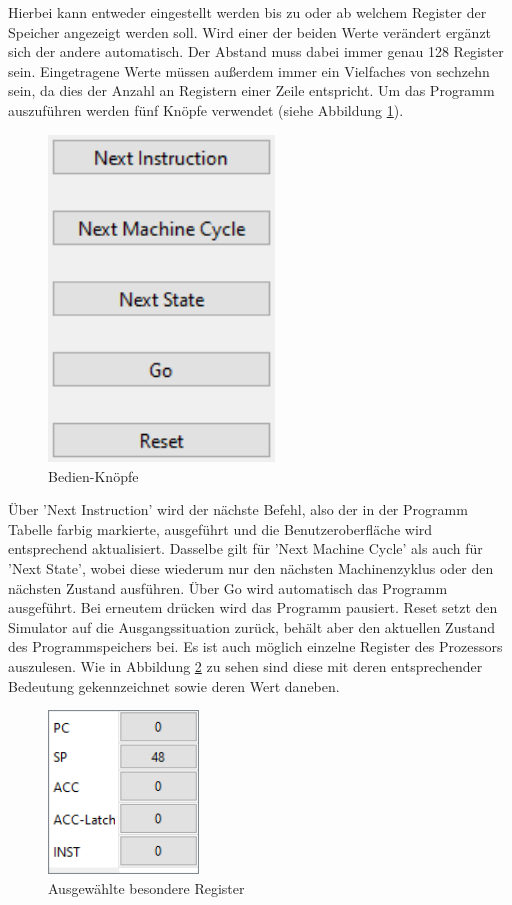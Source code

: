 \documentclass[12pt]{article}
\newcommand{\imgSpaceBefore}{\vspace{10pt}}
\begin{document}
\noindent
Hierbei kann entweder eingestellt werden bis zu oder ab welchem Register der Speicher angezeigt werden soll. Wird einer der beiden Werte verändert ergänzt sich der andere automatisch. Der Abstand muss dabei immer genau 128 Register sein. Eingetragene Werte müssen außerdem immer ein Vielfaches von sechzehn sein, da dies der Anzahl an Registern einer Zeile entspricht. Um das Programm auszuführen werden fünf Knöpfe verwendet (siehe Abbildung \ref{fig:Bedienen}).\imgSpaceBefore

\begin{figure}[H]
\centering
\includegraphics[width=6cm]{bilder/Bedienen}
\caption{Bedien-Knöpfe}
\label{fig:Bedienen}
\end{figure}

\noindent
Über 'Next Instruction' wird der nächste Befehl, also der in der Programm Tabelle farbig markierte, ausgeführt und die Benutzeroberfläche wird entsprechend aktualisiert. Dasselbe gilt für 'Next Machine Cycle' als auch für 'Next State', wobei diese wiederum nur den nächsten Machinenzyklus oder den nächsten Zustand ausführen. Über Go wird automatisch das Programm ausgeführt. Bei erneutem drücken wird das Programm pausiert. Reset setzt den Simulator auf die Ausgangssituation zurück, behält aber den aktuellen Zustand des Programmspeichers bei. Es ist auch möglich einzelne Register des Prozessors auszulesen. Wie in Abbildung \ref{fig:Register} zu sehen sind diese mit deren entsprechender Bedeutung gekennzeichnet sowie deren Wert daneben.\imgSpaceBefore

\begin{figure}[h]
\centering
\includegraphics[width=4cm]{bilder/Register}
\caption{Ausgewählte besondere Register}
\label{fig:Register}
\end{figure}
\end{document}
